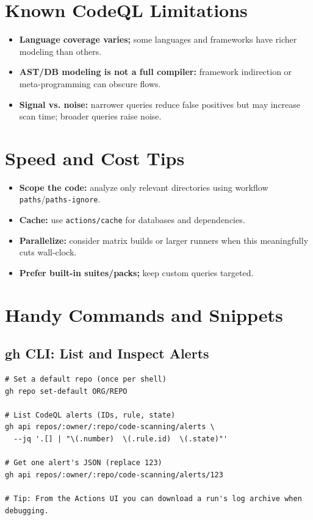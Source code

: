 \documentclass[11pt,letterpaper]{article}
\newcommand{\product}{CodeQL}
\begin{document}
\section{Known \product{} Limitations}
\begin{itemize}
  \item \textbf{Language coverage varies;} some languages and frameworks have richer modeling than others.
  \item \textbf{AST/DB modeling is not a full compiler:} framework indirection or meta-programming can obscure flows.
  \item \textbf{Signal vs. noise:} narrower queries reduce false positives but may increase scan time; broader queries raise noise.
\end{itemize}

\section{Speed and Cost Tips}
\begin{itemize}
  \item \textbf{Scope the code:} analyze only relevant directories using workflow \texttt{paths}/\texttt{paths-ignore}.
  \item \textbf{Cache:} use \texttt{actions/cache} for databases and dependencies.
  \item \textbf{Parallelize:} consider matrix builds or larger runners when this meaningfully cuts wall-clock.
  \item \textbf{Prefer built-in suites/packs;} keep custom queries targeted.
\end{itemize}

\section{Handy Commands and Snippets}
\subsection{gh CLI: List and Inspect Alerts}
\begin{verbatim}
# Set a default repo (once per shell)
gh repo set-default ORG/REPO

# List CodeQL alerts (IDs, rule, state)
gh api repos/:owner/:repo/code-scanning/alerts \
  --jq '.[] | "\(.number)  \(.rule.id)  \(.state)"'

# Get one alert's JSON (replace 123)
gh api repos/:owner/:repo/code-scanning/alerts/123

# Tip: From the Actions UI you can download a run's log archive when debugging.
\end{verbatim}
\end{document}
